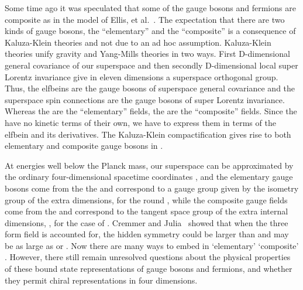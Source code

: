 \documentclass[a4paper,12pt]{article}
\begin{document}
Some time ago it was
speculated that some of the gauge bosons and fermions are composite as in the model
of Ellis, et al.~\cite{Ellis}. The expectation that there are two kinds of gauge
bosons, the ``elementary'' and the ``composite'' is a consequence of Kaluza-Klein
theories and not due to an ad hoc assumption. Kaluza-Klein theories unify gravity
and Yang-Mills theories in two ways. First D-dimensional general covariance of our
superspace \coordHE{} and then secondly D-dimensional local
super Lorentz invariance \coordHE{} give in eleven dimensions a superspace
orthogonal group. Thus, the elfbeins \coordHE{} are the gauge bosons of superspace
general covariance and the superspace spin connections are the gauge bosons of
super Lorentz invariance. Whereas the \coordHE{} are the ``elementary'' fields, the
\coordHE{} are the ``composite'' fields. Since the \coordHE{} have no
kinetic terms of their own, we have to express them in terms of the elfbein and its
derivatives. The Kaluza-Klein compactification gives rise to both elementary and
composite gauge bosons in \coordHE{}.

At energies well below the Planck mass, our superspace can be
approximated by the ordinary four-dimensional spacetime
coordinates \coordHE{}, and the elementary gauge
bosons \coordHE{} come from the the \coordHE{} and
correspond to a gauge group given by the isometry group of the
extra dimensions, \coordHE{} for the round \coordHE{}, while the
composite gauge fields \coordHE{} come from the
\coordHE{} and correspond to the tangent space group
of the extra internal dimensions, \coordHE{}, for the case of \coordHE{}.
Cremmer and Julia~\cite{Cremmer} showed that when the three form
field \coordHE{} is accounted for, the hidden symmetry  could be
larger than \coordHE{} and may be as large as \coordHE{} or \coordHE{}.
Now there are many ways to embed \coordHE{}
in `elementary' \coordHE{} `composite' \coordHE{}. However, there
still remain unresolved questions about the physical properties
of these bound state representations of gauge bosons and
fermions, and whether they permit chiral representations in four dimensions.
\end{document}
